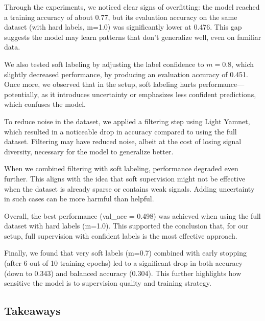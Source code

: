 \documentclass[10pt]{article}
\begin{document}
Through the experiments, we noticed clear signs of overfitting: the model reached a training accuracy of about 0.77, but its evaluation accuracy on the same dataset (with hard labels, m=1.0) was significantly lower at 0.476. This gap suggests the model may learn patterns that don't generalize well, even on familiar data.

We also tested soft labeling by adjusting the label confidence to $m=0.8$, which slightly decreased performance, by producing an evaluation accuracy of 0.451. Once more, we observed that in the setup, soft labeling hurts performance—potentially, as it introduces uncertainty or emphasizes less confident predictions, which confuses the model.

To reduce noise in the dataset, we applied a filtering step using Light Yamnet, which resulted in a noticeable drop in accuracy compared to using the full dataset. Filtering may have reduced noise, albeit at the cost of losing signal diversity, necessary for the model to generalize better.

When we combined filtering with soft labeling, performance degraded even further. This aligns with the idea that soft supervision might not be effective when the dataset is already sparse or contains weak signals. Adding uncertainty in such cases can be more harmful than helpful.

Overall, the best performance (val\_acc = 0.498) was achieved when using the full dataset with hard labels (m=1.0). This supported the conclusion that, for our setup, full supervision with confident labels is the most effective approach.

Finally, we found that very soft labels (m=0.7) combined with early stopping (after 6 out of 10 training epochs) led to a significant drop in both accuracy (down to 0.343) and balanced accuracy (0.304). This further highlights how sensitive the model is to supervision quality and training strategy.

\subsection*{Takeaways}
\end{document}
